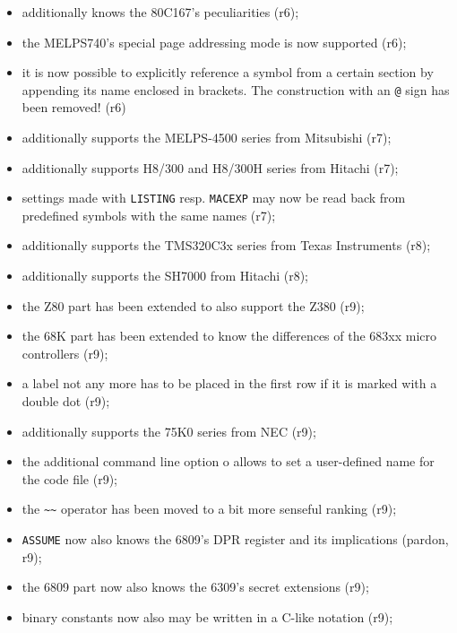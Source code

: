 \documentclass[12pt,twoside]{report}
\newcommand{\tty}[1]{{\tt #1}}
\begin{document}
\begin{itemize}
{\begin{itemize}
{            help of string expressions enclosed in braces (r5);}
      \item{additionally knows the 80C167's peculiarities (r6);}
      \item{the MELPS740's special page addressing mode is now
            supported (r6);}
      \item{it is now possible to explicitly reference a symbol
            from a certain section by appending its name enclosed
            in brackets.  The construction with an \tty{@} sign has
            been removed! (r6)}
      \item{additionally supports the MELPS-4500 series from
            Mitsubishi (r7);}
      \item{additionally supports H8/300 and H8/300H series from
            Hitachi (r7);}
      \item{settings made with \tty{LISTING} resp. \tty{MACEXP} may now be
            read back from predefined symbols with the same names
            (r7);}
      \item{additionally supports the TMS320C3x series from Texas
            Instruments (r8);}
      \item{additionally supports the SH7000 from Hitachi (r8);}
      \item{the Z80 part has been extended to also support the
            Z380 (r9);}
      \item{the 68K part has been extended to know the
            differences of the 683xx micro controllers (r9);}
      \item{a label not any more has to be placed in the first
            row if it is marked with a double dot (r9);}
      \item{additionally supports the 75K0 series from NEC (r9);}
      \item{the additional command line option o allows to set
            a user-defined name for the code file (r9);}
      \item{the \verb!~~! operator has been moved to a bit more senseful
            ranking (r9);}
      \item{\tty{ASSUME} now also knows the 6809's DPR register and its
            implications (pardon, r9);}
      \item{the 6809 part now also knows the 6309's secret
            extensions (r9);}
      \item{binary constants now also may be written in a C-like
            notation (r9);}
      \end{itemize}}

\end{itemize}
\end{document}
